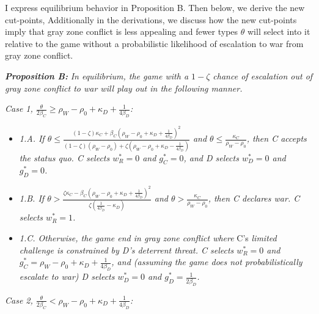 \documentclass[
]{article}
\begin{document}
I express equilibrium behavior in Proposition B. Then below, we derive the new cut-points, Additionally in the derivations, we discuss how the new cut-points imply that gray zone conflict is less appealing and fewer types \(\theta\) will select into it relative to the game without a probabilistic likelihood of escalation to war from gray zone conflict.

\textbf{\textit{Proposition B:}}\textit{ In equilibrium, the game with a $1-\zeta$ chance of escalation out of gray zone conflict to war will play out in the following manner.}

\textit{Case 1, $\frac{\theta}{2\beta_{C}}\geq\rho_{W}-\rho_{0}+\kappa_{D}+\frac{1}{4\beta_{D}}$:}

\begin{itemize}
  \item \textit{1.A. If $\theta\leq\frac{(1-\zeta)\kappa_{C}+\beta_{C}\left(\rho_{W}-\rho_{0}+\kappa_{D}+\frac{1}{4\beta_{D}}\right)^{2}}{(1-\zeta)(\rho_{W}-\rho_{0})+\zeta\left(\rho_{W}-\rho_{0}+\kappa_{D}-\frac{1}{4\beta_{D}}\right)}$ and $\theta\leq\frac{\kappa_{C}}{\rho_{W}-\rho_{0}}$, then C accepts the status quo. C selects $w_{R}^{*}=0$ and $g_{C}^{*}=0$, and D selects $w_{D}^{*}=0$ and $g_{D}^{*}=0$. } 
  \item \textit{1.B. If $\theta>\frac{\zeta\kappa_{C}-\beta_{C}\left(\rho_{W}-\rho_{0}+\kappa_{D}+\frac{1}{4\beta_{D}}\right)^{2}}{\zeta\left(\frac{1}{4\beta_{D}}-\kappa_{D}\right)}$ and $\theta>\frac{\kappa_{C}}{\rho_{W}-\rho_{0}}$, then C declares war. C selects $w_{R}^{*}=1$.} 
  \item \textit{1.C. Otherwise, the game end in gray zone conflict where }C's\textit{ limited challenge is constrained by D's deterrent threat. C selects $w_{R}^{*}=0$ and $g_{C}^{*}=\rho_{W}-\rho_{0}+\kappa_{D}+\frac{1}{4\beta_{D}}$, and (assuming the game does not probabilistically escalate to war) D selects $w_{D}^{*}=0$ and $g_{D}^{*}=\frac{1}{2\beta_{D}}$. } 
  \end{itemize}

\textit{Case 2, $\frac{\theta}{2\beta_{C}}<\rho_{W}-\rho_{0}+\kappa_{D}+\frac{1}{4\beta_{D}}$:}
\end{document}
